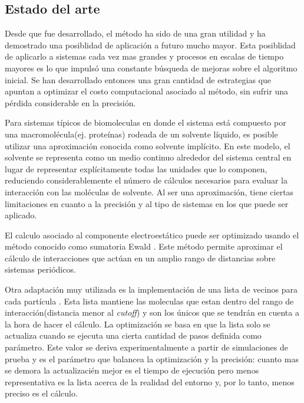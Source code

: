 \subsection{Estado del arte}



Desde que fue desarrollado, el método ha sido de una gran utilidad y ha demostrado una posiblidad de aplicación a futuro mucho mayor. 
Esta posiblidad de aplicarlo a sistemas cada vez mas grandes y procesos en escalas de tiempo mayores es lo que impulsó una constante búsqueda de mejoras sobre el algoritmo inicial.
Se han desarrollado entonces una gran cantidad de estrategias que apuntan a optimizar el costo computacional asociado al método, sin sufrir una pérdida considerable en la precisión.

Para sistemas típicos de biomoleculas en donde el sistema está compuesto por una macromolécula(ej. proteínas) rodeada de un solvente líquido, es posible utilizar una aproximación conocida 
como solvente implícito\cite{tsui2000theory}.
En este modelo, el solvente se representa como un medio continuo alrededor del sistema central en lugar de representar explícitamente todas las unidades que lo componen, 
reduciendo considerablemente el número de cálculos necesarios para evaluar la interacción con las moléculas de solvente. Al ser una aproximación, tiene ciertas limitaciones en cuanto 
a la precisión y al tipo de sistemas en los que puede ser aplicado.

El calculo asociado al componente electroestático puede ser optimizado usando el método conocido como sumatoria Ewald \cite{toukmaji1996ewald}. 
Este método permite aproximar el cálculo de interacciones que actúan en un amplio rango de distancias sobre sistemas periódicos. 

Otra adaptación muy utilizada es la implementación de una lista de vecinos para cada partícula \cite{plimpton1995fast}. 
Esta lista mantiene las moleculas que estan dentro del rango de interacción(distancia menor al \textit{cutoff}) y son los únicos que se tendrán en cuenta a la hora de hacer el cálculo. 
La optimización se basa en que la lista solo se actualiza cuando se ejecuta una cierta cantidad de pasos definida como parámetro. 
Este valor se deriva experimentalmente a partir de simulaciones de prueba y es el parámetro que balancea la optimización y la precisión: cuanto mas se demora la actualizacién mejor es el 
tiempo de ejecución pero menos representativa es la lista acerca de la realidad del entorno y, por lo tanto, menos preciso es el cálculo.


